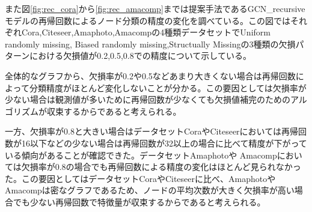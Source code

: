 また図\ref{fig:rec_cora}から\ref{fig:rec_amacomp}までは提案手法であるGCN\_recursiveモデルの再帰回数によるノード分類の精度の変化を調べている。この図ではそれぞれCora,Citeseer,Amaphoto,Amacompの4種類データセットでUniform randomly missing, Biased randomly missing,Structually Missingの3種類の欠損パターンにおける欠損値が0.2,0.5,0.8での精度について示している。

全体的なグラフから、欠損率が0.2や0.5などあまり大きくない場合は再帰回数によって分類精度がほとんど変化しないことが分かる。この要因としては欠損率が少ない場合は観測値が多いために再帰回数が少なくても欠損値補完のためのアルゴリズムが収束するからであると考えられる。

一方、欠損率が0.8と大きい場合はデータセットCoraやCiteseerにおいては再帰回数が16以下などの少ない場合は再帰回数が32以上の場合に比べて精度が下がっている傾向があることが確認できた。データセットAmaphotoや Amacompにおいては欠損率が0.8の場合でも再帰回数による精度の変化はほとんど見られなかった。この要因としてはデータセットCoraやCiteseerに比べ、AmaphotoやAmacompは密なグラフであるため、ノードの平均次数が大きく欠損率が高い場合でも少ない再帰回数で特徴量が収束するからであると考えられる。

